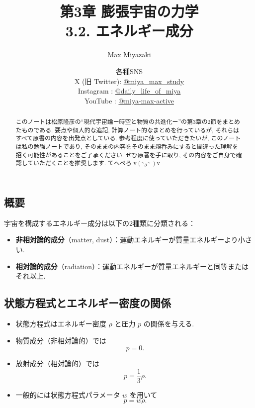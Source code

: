 \documentclass[a4paper,12pt]{article}
\title{第3章 膨張宇宙の力学\\
3.2. エネルギー成分}
\date{各種SNS\\
    X (旧 Twitter): \href{https://x.com/miya_max_study}{@miya\_max\_study}\\
    Instagram : \href{https://www.instagram.com/daily_life_of_miya/}{@daily\_life\_of\_miya}\\
    YouTube : \href{https://www.youtube.com/@miya-max-active}{@miya-max-active}
    }
\author{Max Miyazaki}
\begin{document}
\maketitle

\vspace{1cm}
\begin{abstract}
    このノートは松原隆彦の``現代宇宙論ー時空と物質の共進化ー''の第3章の2節をまとめたものである. 要点や個人的な追記, 計算ノート的なまとめを行っているが, それらはすべて原書の内容を出発点としている. 参考程度に使っていただきたいが, このノートは私の勉強ノートであり, そのままの内容をそのまま鵜呑みにすると間違った理解を招く可能性があることをご了承ください. ぜひ原著を手に取り, その内容をご自身で確認していただくことを推奨します. てへぺろ v$({\hat{\cdot}_\partial \hat{\cdot}})$v



\end{abstract}
    
    

\newpage

\color{blue}
\subsection*{概要}
宇宙を構成するエネルギー成分は以下の2種類に分類される：
\begin{itemize}
    \item \textbf{非相対論的成分}（matter, dust）：運動エネルギーが質量エネルギーより小さい.
    \item \textbf{相対論的成分}（radiation）：運動エネルギーが質量エネルギーと同等またはそれ以上.
\end{itemize}

\subsection*{状態方程式とエネルギー密度の関係}

\begin{itemize}
  \item 状態方程式はエネルギー密度 $\rho$ と圧力 $p$ の関係を与える.
  \item 物質成分（非相対論的）では
  \begin{equation*}
    p = 0.
  \end{equation*}
  \item 放射成分（相対論的）では
  \begin{equation*}
    p = \frac{1}{3}\rho.
  \end{equation*}
  \item 一般的には状態方程式パラメータ $w$ を用いて
  \begin{equation*}
    p = w \rho.
  \end{equation*}
\end{itemize}
\end{document}
